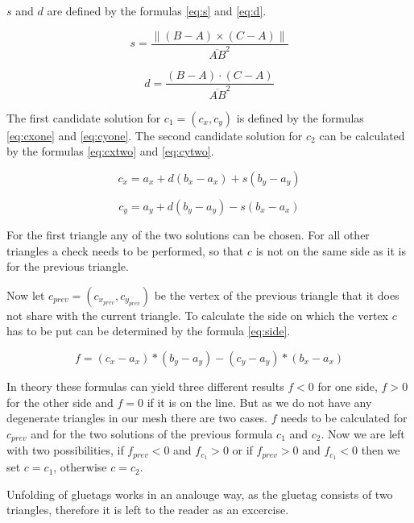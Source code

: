 \documentclass[draft,final]{vutinfth} %
\begin{document}
$s$ and $d$ are defined by the formulas \ref{eq:s} and \ref{eq:d}.

\begin{equation}
\label{eq:s}
s = \frac{\|(B - A)\times(C - A)\|}{\overline{AB}^2}
\end{equation}

\begin{equation}
\label{eq:d}
d = \frac{(B-A)\cdot(C-A)}{\overline{AB}^2}
\end{equation}

The first candidate solution for $c_1 = (c_x, c_y)$ is defined by the formulas \ref{eq:cxone} and \ref{eq:cyone}. The second candidate solution for $c_2$ can be calculated by the formulas \ref{eq:cxtwo} and \ref{eq:cytwo}. 

\begin{equation}
\label{eq:cxtwo}
c_x = a_x + d(b_x - a_x) + s(b_y - a_y)
\end{equation}

\begin{equation}
\label{eq:cytwo}
c_y = a_y + d(b_y - a_y) - s(b_x - a_x)
\end{equation}

For the first triangle any of the two solutions can be chosen. For all other triangles a check needs to be performed, so that $c$ is not on the same side as it is for the previous triangle.


Now let $c_{prev} = (c_{x_{prev}},c_{y_{prev}})$ be the vertex of the previous triangle that it does not share with the current triangle. To calculate the side on which the vertex $c$ has to be put can be determined by the formula \ref{eq:side}.

\begin{equation}
\label{eq:side}
f = (c_x - a_x) * (b_y - a_y) - (c_y - a_y) * (b_x - a_x)
\end{equation}

In theory these formulas can yield three different results $f < 0$ for one side, $f > 0$ for the other side and $f = 0$ if it is on the line. But as we do not have any degenerate triangles in our mesh there are two cases. $f$ needs to be calculated for $c_{prev}$ and for the two solutions of the previous formula $c_1$ and $c_2$. Now we are left with two possibilities, if $f_{prev} < 0$ and $f_{c_1} > 0$ or if $f_{prev} > 0$ and $f_{c_1} < 0$ then we set $c = c_1$, otherwise $c = c_2$.

Unfolding of gluetags works in an analouge way, as the gluetag consists of two triangles, therefore it is left to the reader as an excercise.
\end{document}
